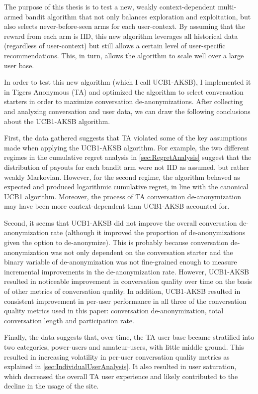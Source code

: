 The purpose of this thesis is to test a new, weakly context-dependent multi-armed bandit algorithm that not only balances exploration and exploitation, but also selects never-before-seen arms for each user-context. By assuming that the reward from each arm is IID, this new algorithm leverages all historical data (regardless of user-context) but still allows a certain level of user-specific recommendations. This, in turn, allows the algorithm to scale well over a large user base.

In order to test this new algorithm (which I call UCB1-AKSB), I implemented it in Tigers Anonymous (TA) and optimized the algorithm to select conversation starters in order to maximize conversation de-anonymizations. After collecting and analyzing conversation and user data, we can draw the following conclusions about the UCB1-AKSB algorithm.

First, the data gathered suggests that TA violated some of the key assumptions made when applying the UCB1-AKSB algorithm. For example, the two different regimes in the cumulative regret analysis in \autoref{sec:RegretAnalysis} suggest that the distribution of payouts for each bandit arm were not IID as assumed, but rather weakly Markovian. However, for the second regime, the algorithm behaved as expected and produced logarithmic cumulative regret, in line with the canonical UCB1 algorithm. Moreover, the process of TA conversation de-anonymization may have been more context-dependent than UCB1-AKSB accounted for.

Second, it seems that UCB1-AKSB did not improve the overall conversation de-anonymization rate (although it improved the proportion of de-anonymizations given the option to de-anonymize). This is probably because conversation de-anonymization was not only dependent on the conversation starter and the binary variable of de-anonymization was not fine-grained enough to measure incremental improvements in the de-anonymization rate. However, UCB1-AKSB resulted in noticeable improvement in conversation quality over time on the basis of other metrics of conversation quality. In addition, UCB1-AKSB resulted in consistent improvement in per-user performance in all three of the conversation quality metrics used in this paper: conversation de-anonymization, total conversation length and participation rate.

Finally, the data suggests that, over time, the TA user base became stratified into two categories, power-users and amateur-users, with little middle ground. This resulted in increasing volatility in per-user conversation quality metrics as explained in \autoref{sec:IndividualUserAnalysis}. It also resulted in user saturation, which decreased the overall TA user experience and likely contributed to the decline in the usage of the site.

